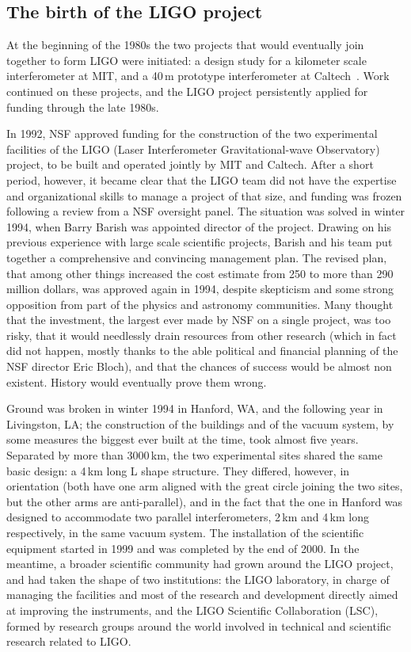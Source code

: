 \subsection{The birth of the LIGO project}
At the beginning of the 1980s the two projects that would eventually join together to form LIGO were initiated: 
a design study for a kilometer scale interferometer at MIT, and a 40\,m 
prototype interferometer at Caltech~\cite{Spero_1989}. Work continued on these projects, and the LIGO project persistently applied for funding through the late 1980s.

In 1992, NSF approved funding for the construction of the two experimental facilities of the LIGO (Laser Interferometer Gravitational-wave Observatory) project\cite{Abramovici_1992}, to be built and operated jointly by MIT and Caltech.
After a short period, however, it became clear that the LIGO team did not have the expertise and organizational skills to manage a project of that size, and funding was frozen following a review from a NSF oversight panel.
The situation was solved in winter 1994, when Barry Barish was appointed director of the project. Drawing on his previous experience with large scale scientific projects, Barish and his team put together a comprehensive and convincing management plan.
The revised plan, that among other things increased the cost estimate from 250 to more than 290 million dollars, was approved again in 1994, despite skepticism and some strong opposition from part of the physics and astronomy communities. 
Many thought that the investment, the largest ever made by NSF on a  single project, was too risky, that it would needlessly drain resources from other research (which in fact did not happen, mostly thanks to the able political and financial planning of the NSF director Eric Bloch), and that the chances of success would be almost non existent.
History would eventually prove them wrong.

Ground was broken in winter 1994 in Hanford, WA, and the following year in Livingston, LA; 
the construction of the buildings and of the vacuum system, by some measures the biggest 
ever built at the time, took almost five years. Separated by more than 3000\,km, the two 
experimental sites shared the same basic design: a 4\,km long L shape structure. They 
differed, however, in orientation (both have one arm aligned with the great circle joining the two sites, but the other arms are anti-parallel), and in the fact that the one in Hanford was 
designed to accommodate two parallel interferometers, 2\,km and 4\,km long respectively, in the same vacuum system. 
The installation of the scientific equipment started in 1999 and was completed by the end of 2000. 
In the meantime, a broader scientific community had grown around the LIGO project, 
and had taken the shape of two institutions: the LIGO laboratory, in charge of managing 
the facilities and most of the research and development directly aimed at improving the 
instruments, and the LIGO Scientific Collaboration (LSC), formed by research groups 
around the world involved in technical and scientific research related to LIGO.

